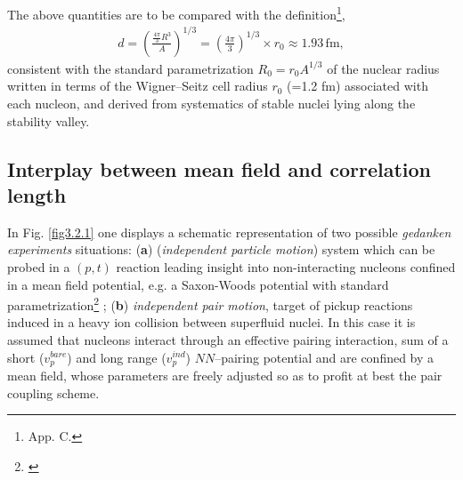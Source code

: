The above quantities are to be compared with the definition\footnote{\cite{Brink:05} App. C.},
\begin{align}\label{eq3.2.27}
d=\left(\frac{\frac{4\pi}{3}R^3}{A}\right)^{1/3}=\left(\frac{4\pi}{3}\right)^{1/3}\times r_0\approx 1.93\, \text{fm},
\end{align} 
consistent with the standard parametrization $R_0=r_0A^{1/3}$ of the nuclear radius written in terms of the Wigner--Seitz cell radius $r_0$ (=1.2 fm)  associated with each nucleon, and derived from systematics of stable nuclei lying along the stability valley.
\subsection{Interplay between mean field and correlation length}
In Fig. \ref{fig3.2.1} one displays a schematic representation of two possible \textit{gedanken experiments} situations: (\textbf{a}) (\textit{independent particle motion}) system which can be probed in a $(p,t)$ reaction leading insight into  non-interacting nucleons confined in a mean field potential, e.g. a Saxon-Woods potential with standard parametrization\footnote{\cite{Bohr:69}} ; (\textbf{b}) \textit{independent pair motion}, target of pickup reactions induced in a heavy ion collision between superfluid nuclei. In this case it is assumed that nucleons interact through an effective pairing interaction, sum of a short ($v_p^{bare}$) and long range ($v_p^{ind}$) $NN$--pairing potential and are confined by a mean field, whose parameters are freely adjusted so as to profit at best the pair coupling scheme.


